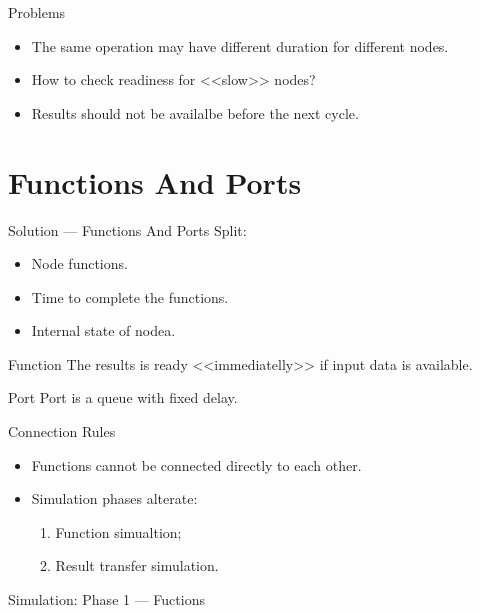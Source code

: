 \begin{frame}{Problems}
\begin{itemize}
\item The same operation may have different duration for different nodes.
\item How to check readiness for <<slow>> nodes?
\item Results should not be availalbe before the next cycle.
\end{itemize}
\end{frame}

\section{Functions And Ports}

\begin{frame}{Solution --- Functions And Ports}
Split:
\begin{itemize}
\item Node functions.
\item Time to complete the functions.
\item Internal state of nodea.
\end{itemize}
\end{frame}

\begin{frame}{Function}
The results is ready <<immediatelly>> if input data is available.
\vfill
\centering
{}
\end{frame}

\begin{frame}{Port}
Port is a queue with fixed delay.
\vfill
\centering
{}
\end{frame}

\begin{frame}{Connection Rules}
\begin{itemize}
\item Functions cannot be connected directly to each other.
\item Simulation phases alterate:
  \begin{enumerate}
  \item Function simualtion;
  \item Result transfer simulation.
  \end{enumerate}
\end{itemize}
\end{frame}

\begin{frame}{Simulation: Phase 1 --- Fuctions}
\centering
{}
\end{frame}

